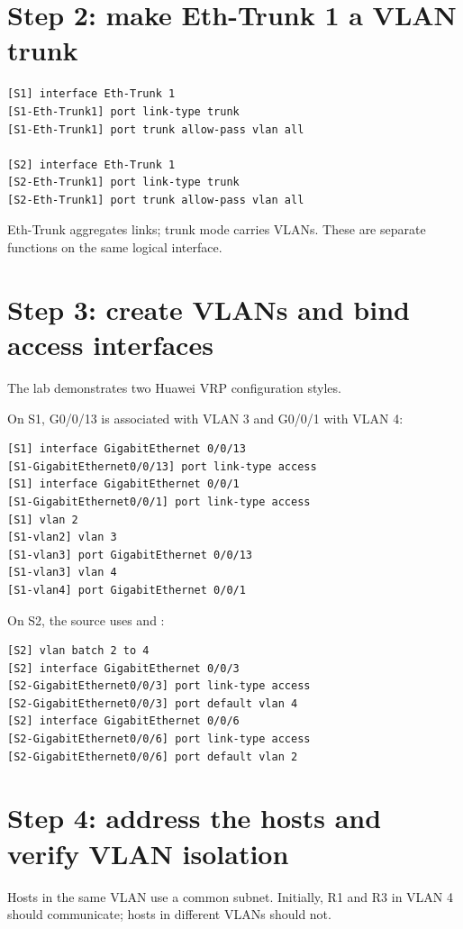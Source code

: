 \section{Step 2: make Eth-Trunk 1 a VLAN trunk}
\begin{lstlisting}[style=dcnterminal]
[S1] interface Eth-Trunk 1
[S1-Eth-Trunk1] port link-type trunk
[S1-Eth-Trunk1] port trunk allow-pass vlan all

[S2] interface Eth-Trunk 1
[S2-Eth-Trunk1] port link-type trunk
[S2-Eth-Trunk1] port trunk allow-pass vlan all
\end{lstlisting}

\begin{keyidea}
Eth-Trunk aggregates links; trunk mode carries VLANs. These are separate functions on the same logical interface.
\end{keyidea}

\section{Step 3: create VLANs and bind access interfaces}
The lab demonstrates two Huawei VRP configuration styles.

On S1, G0/0/13 is associated with VLAN 3 and G0/0/1 with VLAN 4:
\begin{lstlisting}[style=dcnterminal]
[S1] interface GigabitEthernet 0/0/13
[S1-GigabitEthernet0/0/13] port link-type access
[S1] interface GigabitEthernet 0/0/1
[S1-GigabitEthernet0/0/1] port link-type access
[S1] vlan 2
[S1-vlan2] vlan 3
[S1-vlan3] port GigabitEthernet 0/0/13
[S1-vlan3] vlan 4
[S1-vlan4] port GigabitEthernet 0/0/1
\end{lstlisting}

On S2, the source uses  and :
\begin{lstlisting}[style=dcnterminal]
[S2] vlan batch 2 to 4
[S2] interface GigabitEthernet 0/0/3
[S2-GigabitEthernet0/0/3] port link-type access
[S2-GigabitEthernet0/0/3] port default vlan 4
[S2] interface GigabitEthernet 0/0/6
[S2-GigabitEthernet0/0/6] port link-type access
[S2-GigabitEthernet0/0/6] port default vlan 2
\end{lstlisting}

\section{Step 4: address the hosts and verify VLAN isolation}
Hosts in the same VLAN use a common subnet. Initially, R1 and R3 in VLAN 4 should communicate; hosts in different VLANs should not.

